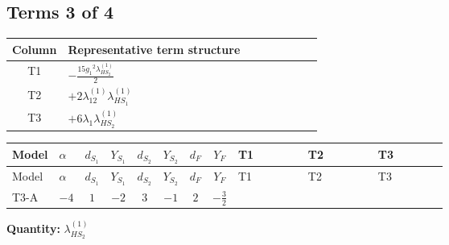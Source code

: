 \documentclass[8pt]{article}
\begin{document}
\begin{landscape}
\subsection*{Terms 3 of 4}
\begin{center}
\begin{tabular}{@{}c >{\raggedright\arraybackslash}p{0.82\linewidth}@{}}
\toprule
Column & Representative term structure \\
\midrule
T1 & \(\displaystyle -\frac{15 {g_1}^2 {\lambda_{HS_2}^{(1)}}}{2}\) \\
\midrule
T2 & \(\displaystyle +2 {\lambda_{12}^{(1)}} {\lambda_{HS_1}^{(1)}}\) \\
\midrule
T3 & \(\displaystyle +6 {\lambda_1} {\lambda_{HS_2}^{(1)}}\) \\
\midrule
\bottomrule
\end{tabular}
\end{center}
\smallskip
\tiny
\begin{longtable}{@{}llcccccc >{\raggedright\arraybackslash}p{0.21\linewidth} >{\raggedright\arraybackslash}p{0.21\linewidth} >{\raggedright\arraybackslash}p{0.21\linewidth}@{}}
\toprule
Model & $\alpha$ & $d_{S_1}$ & $Y_{S_1}$ & $d_{S_2}$ & $Y_{S_2}$ & $d_F$ & $Y_F$ & T1 & T2 & T3 \\
\midrule
\endfirsthead
\toprule
Model & $\alpha$ & $d_{S_1}$ & $Y_{S_1}$ & $d_{S_2}$ & $Y_{S_2}$ & $d_F$ & $Y_F$ & T1 & T2 & T3 \\
\midrule
\endhead
T3-A & $-4$ & $1$ & $-2$ & $3$ & $-1$ & $2$ & $-\frac{3}{2}$ & \scriptsize\adjustbox{max width=\linewidth}{$\begin{gathered} -\frac{15 {g_1}^2 {\lambda_{HS_2}^{(1)}}}{2}\end{gathered}$} & \scriptsize\adjustbox{max width=\linewidth}{$\begin{gathered} +2 {\lambda_{12}^{(1)}} {\lambda_{HS_1}^{(1)}}\end{gathered}$} & \scriptsize\adjustbox{max width=\linewidth}{$\begin{gathered} +6 {\lambda_1} {\lambda_{HS_2}^{(1)}}\end{gathered}$} \\
\midrule
\bottomrule
\end{longtable}
\clearpage
\noindent\textbf{Quantity: }$\lambda_{HS_2}^{(1)}$\par\smallskip

\end{landscape}
\end{document}
